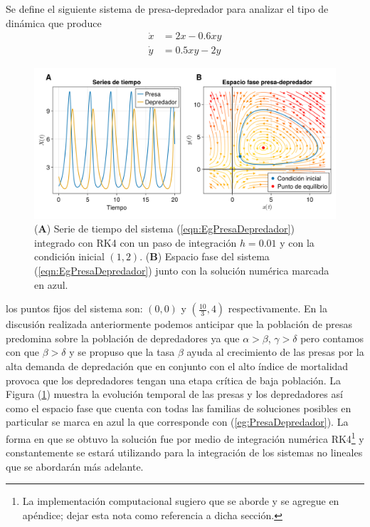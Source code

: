 \begin{ejemplo}\label{eg:PresaDepredador}
	Se define el siguiente sistema de presa-depredador para analizar el tipo de dinámica que produce
	\begin{equation}\label{eqn:EgPresaDepredador}
		\begin{split}
			\dot{x} &= 2x-0.6xy \\
			\dot{y} &= 0.5xy-2y
		\end{split}
	\end{equation}
	\begin{figure}[h!]
		\centering
		\includegraphics[scale=0.215]{../../Imagenes/Espacio fase PD}
		\caption{(\textbf{A}) Serie de tiempo del sistema (\ref{eqn:EgPresaDepredador}) integrado con RK4 con un paso de integración $h=0.01$ y con la condición inicial $(1,2)$. (\textbf{B}) Espacio fase del sistema (\ref{eqn:EgPresaDepredador}) junto con la solución numérica marcada en azul.}
		\label{fig:EspacioFasePD}
	\end{figure}
	los puntos fijos del sistema son: $(0,0)$ y $(\frac{10}{3},4)$ respectivamente. En la discusión realizada anteriormente podemos anticipar que la población de presas predomina sobre la población de depredadores ya que $\alpha>\beta$, $\gamma>\delta$ pero contamos con que $\beta>\delta$ y se propuso que la tasa $\beta$ ayuda al crecimiento de las presas por la alta demanda de depredación que en conjunto con el alto índice de mortalidad provoca que los depredadores tengan una etapa crítica de baja población. La Figura (\ref{fig:EspacioFasePD}) muestra la evolución temporal de las presas y los depredadores así como el espacio fase que cuenta con todas las familias de soluciones posibles en particular se marca en azul la que corresponde con (\ref{eg:PresaDepredador}). La forma en que se obtuvo la solución fue por medio de integración numérica RK4\footnote{La implementación computacional sugiero que se aborde y se agregue en apéndice; dejar esta nota como referencia a dicha sección.} y constantemente se estará utilizando para la integración de los sistemas no lineales que se abordarán más adelante.
	
\end{ejemplo}

